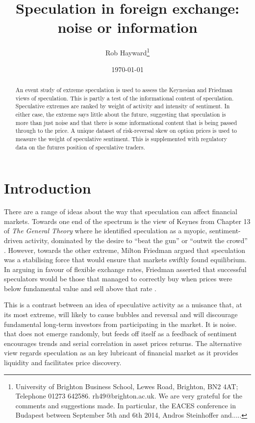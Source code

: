 \documentclass[12pt, a4paper, oneside]{article} %
\begin{document}
\title{Speculation in foreign exchange: noise or information}
\author{Rob Hayward\footnote{University of Brighton Business School, Lewes Road, Brighton, BN2 4AT; Telephone 01273 642586.  rh49@brighton.ac.uk.  We are very grateful for the comments and suggestions made.  In particular, the EACES conference in Budapest between September 5th and 6th 2014, Andros Steinhoffer and.....}} 
\date{\today}
\maketitle
\begin{abstract}
An event study of extreme speculation is used to assess the Keynesian and Friedman views of speculation.  This is partly a test of the informational content of speculation.  Speculative extremes are ranked by weight of activity and intensity of sentiment.  In either case, the extreme says little about the future, suggesting that speculation is more than just noise and that there is some informational content that is being passed through to the price. A unique dataset of risk-reversal skew on option prices is used to measure the weight of speculative sentiment.  This is supplemented with regulatory data on the futures position of speculative traders.  
\end{abstract}

\section{Introduction}

There are a range of ideas about the way that speculation can affect financial markets.  Towards one end of the spectrum is the view of Keynes from Chapter 13 of \emph{The General Theory} where he identified speculation as a myopic, sentiment-driven activity, dominated by the desire to ``beat the gun'' or  ``outwit the crowd'' \citep[p. 101]{Keynes1936}.  However, towards the other extreme, Milton Friedman argued that speculation was a stabilising force that would ensure that markets swiftly found equilibrium. In arguing in favour of flexible exchange rates, Friedman asserted that successful speculators would be those that managed to correctly buy when prices  were below fundamental value and sell above that rate \citep{FriedmanPositive}. 

This is a contrast between an idea of speculative activity as a nuisance that, at its most extreme, will likely to cause bubbles and reversal and will discourage fundamental long-term investors from participating in the market.  It is noise.   that does not emerge randomly, but feeds off itself as a feedback of sentiment  encourages  trends and serial correlation in asset prices returns.  The alternative view regards speculation as an key lubricant of financial market as it provides liquidity and facilitates price discovery.  
\end{document}
